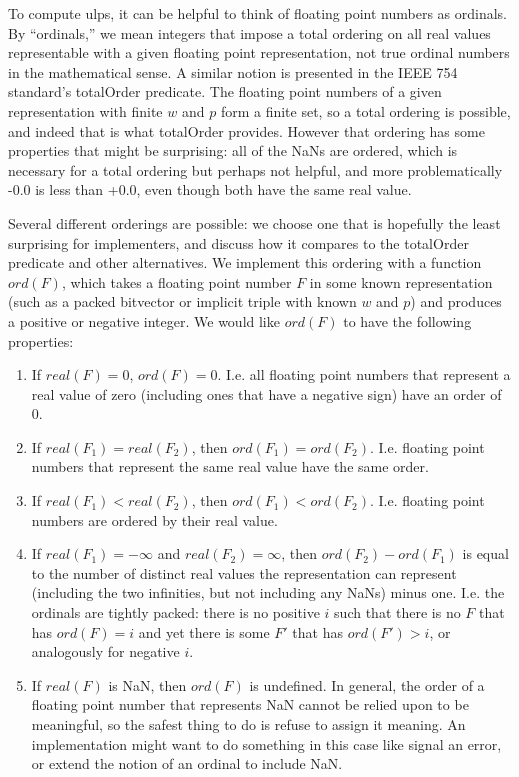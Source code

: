 \documentclass[letterpaper,10pt]{article}
\begin{document}
To compute ulps, it can be helpful to think of floating point numbers as ordinals. By ``ordinals,'' we mean integers that impose a total ordering on all real values representable with a given floating point representation, not true ordinal numbers in the mathematical sense. A similar notion is presented in the IEEE 754 standard's totalOrder predicate. The floating point numbers of a given representation with finite $w$ and $p$ form a finite set, so a total ordering is possible, and indeed that is what totalOrder provides. However that ordering has some properties that might be surprising: all of the NaNs are ordered, which is necessary for a total ordering but perhaps not helpful, and more problematically -0.0 is less than +0.0, even though both have the same real value.

Several different orderings are possible: we choose one that is hopefully the least surprising for implementers, and discuss how it compares to the totalOrder predicate and other alternatives. We implement this ordering with a function $ord(F)$, which takes a floating point number $F$ in some known representation (such as a packed bitvector or implicit triple with known $w$ and $p$) and produces a positive or negative integer. We would like $ord(F)$ to have the following properties:

\begin{enumerate}
 \item If $real(F) = 0$, $ord(F) = 0$. I.e. all floating point numbers that represent a real value of zero (including ones that have a negative sign) have an order of 0.
 \item If $real(F_1) = real(F_2)$, then $ord(F_1) = ord(F_2)$. I.e. floating point numbers that represent the same real value have the same order.
 \item If $real(F_1) < real(F_2)$, then $ord(F_1) < ord(F_2)$. I.e. floating point numbers are ordered by their real value.
 \item If $real(F_1) = -\infty$ and $real(F_2) = \infty$, then $ord(F_2) - ord(F_1)$ is equal to the number of distinct real values the representation can represent (including the two infinities, but not including any NaNs) minus one. I.e. the ordinals are tightly packed: there is no positive $i$ such that there is no $F$ that has $ord(F) = i$ and yet there is some $F'$ that has $ord(F') > i$, or analogously for negative $i$.
 \item If $real(F)$ is NaN, then $ord(F)$ is undefined. In general, the order of a floating point number that represents NaN cannot be relied upon to be meaningful, so the safest thing to do is refuse to assign it meaning. An implementation might want to do something in this case like signal an error, or extend the notion of an ordinal to include NaN.
\end{enumerate}
\end{document}
